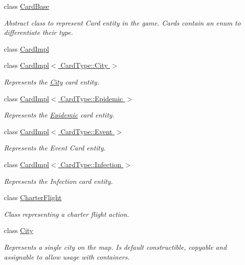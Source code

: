 \begin{DoxyCompactItemize}
class \hyperlink{classpan_1_1_card_base}{Card\+Base}
\begin{DoxyCompactList}\small\item\em Abstract class to represent Card entity in the game. Cards contain an enum to differentiate their type. \end{DoxyCompactList}\item 
class \hyperlink{classpan_1_1_card_impl}{Card\+Impl}
\item 
class \hyperlink{classpan_1_1_card_impl_3_01_card_type_1_1_city_01_4}{Card\+Impl$<$ Card\+Type\+::\+City $>$}
\begin{DoxyCompactList}\small\item\em Represents the \hyperlink{classpan_1_1_city}{City} card entity. \end{DoxyCompactList}\item 
class \hyperlink{classpan_1_1_card_impl_3_01_card_type_1_1_epidemic_01_4}{Card\+Impl$<$ Card\+Type\+::\+Epidemic $>$}
\begin{DoxyCompactList}\small\item\em Represents the \hyperlink{classpan_1_1_epidemic}{Epidemic} card entity. \end{DoxyCompactList}\item 
class \hyperlink{classpan_1_1_card_impl_3_01_card_type_1_1_event_01_4}{Card\+Impl$<$ Card\+Type\+::\+Event $>$}
\begin{DoxyCompactList}\small\item\em Represents the Event Card entity. \end{DoxyCompactList}\item 
class \hyperlink{classpan_1_1_card_impl_3_01_card_type_1_1_infection_01_4}{Card\+Impl$<$ Card\+Type\+::\+Infection $>$}
\begin{DoxyCompactList}\small\item\em Represents the Infection card entity. \end{DoxyCompactList}\item 
class \hyperlink{classpan_1_1_charter_flight}{Charter\+Flight}
\begin{DoxyCompactList}\small\item\em Class representing a charter flight action. \end{DoxyCompactList}\item 
class \hyperlink{classpan_1_1_city}{City}
\begin{DoxyCompactList}\small\item\em Represents a single city on the map. Is default constructible, copyable and assignable to allow usage with containers. \end{DoxyCompactList}\item 

\end{DoxyCompactItemize}
